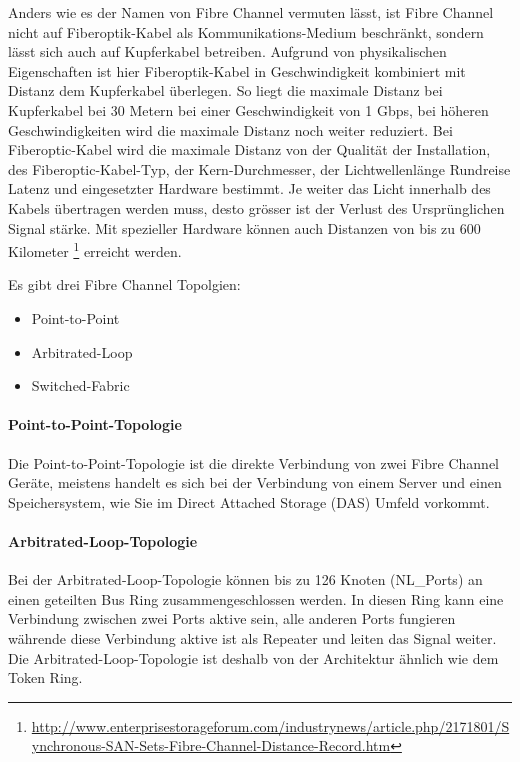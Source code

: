 Anders wie es der Namen von Fibre Channel vermuten lässt, ist Fibre Channel nicht auf Fiberoptik-Kabel als Kommunikations-Medium beschränkt, sondern lässt sich auch auf Kupferkabel betreiben. Aufgrund von physikalischen Eigenschaften ist hier Fiberoptik-Kabel in Geschwindigkeit kombiniert mit Distanz dem Kupferkabel überlegen. So liegt die maximale Distanz bei Kupferkabel bei 30 Metern bei einer Geschwindigkeit von 1 Gbps, bei höheren Geschwindigkeiten wird die maximale Distanz noch weiter reduziert. Bei Fiberoptic-Kabel wird die maximale Distanz von der Qualität der Installation, des Fiberoptic-Kabel-Typ, der Kern-Durchmesser, der Lichtwellenlänge Rundreise Latenz und eingesetzter Hardware bestimmt. Je weiter das Licht innerhalb des Kabels übertragen werden muss, desto grösser ist der Verlust des Ursprünglichen Signal stärke. Mit spezieller Hardware können auch Distanzen von bis zu 600 Kilometer \footnote{\url{http://www.enterprisestorageforum.com/industrynews/article.php/2171801/Synchronous-SAN-Sets-Fibre-Channel-Distance-Record.htm}} erreicht werden.

Es gibt drei Fibre Channel Topolgien:
\begin{itemize}
\item Point-to-Point
\item Arbitrated-Loop
\item Switched-Fabric
\end{itemize}

\paragraph*{Point-to-Point-Topologie}
Die Point-to-Point-Topologie ist die direkte Verbindung von zwei Fibre Channel Geräte, meistens handelt es sich bei der Verbindung von einem Server und einen Speichersystem, wie Sie im Direct Attached Storage (DAS) Umfeld vorkommt. \cite{Christopher2009}

\paragraph*{Arbitrated-Loop-Topologie}
Bei der Arbitrated-Loop-Topologie können bis zu 126 Knoten (NL\_Ports) an einen geteilten Bus Ring zusammengeschlossen werden. In diesen Ring kann eine Verbindung zwischen zwei Ports aktive sein, alle anderen Ports fungieren währende diese Verbindung aktive ist als Repeater und leiten das Signal weiter. Die Arbitrated-Loop-Topologie ist deshalb von der Architektur ähnlich wie dem Token Ring.\cite{Gupta2002}\cite{Christopher2009}

